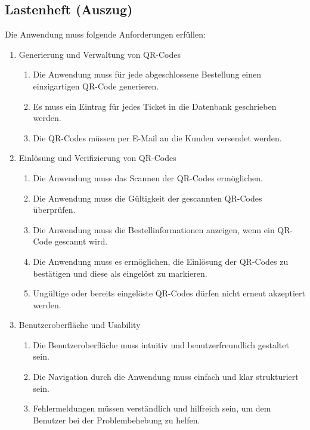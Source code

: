 \subsection{Lastenheft (Auszug)}
\label{app:Lastenheft}

Die Anwendung muss folgende Anforderungen erfüllen:
\begin{enumerate}[itemsep=0em,partopsep=0em,parsep=0em,topsep=0em]
    \item Generierung und Verwaltung von QR-Codes
    \begin{enumerate}
        \item Die Anwendung muss für jede abgeschlossene Bestellung einen einzigartigen QR-Code generieren.
        \item Es muss ein Eintrag für jedes Ticket in die Datenbank geschrieben werden.
        \item Die QR-Codes müssen per E-Mail an die Kunden versendet werden.
    \end{enumerate}

    \item Einlösung und Verifizierung von QR-Codes
    \begin{enumerate}
        \item Die Anwendung muss das Scannen der QR-Codes ermöglichen.
        \item Die Anwendung muss die Gültigkeit der gescannten QR-Codes überprüfen.
        \item Die Anwendung muss die Bestellinformationen anzeigen, wenn ein QR-Code gescannt wird.
        \item Die Anwendung muss es ermöglichen, die Einlösung der QR-Codes zu bestätigen und diese als eingelöst zu markieren.
        \item Ungültige oder bereits eingelöste QR-Codes dürfen nicht erneut akzeptiert werden.
    \end{enumerate}

    \item Benutzeroberfläche und Usability
    \begin{enumerate}
        \item Die Benutzeroberfläche muss intuitiv und benutzerfreundlich gestaltet sein.
        \item Die Navigation durch die Anwendung muss einfach und klar strukturiert sein.
        \item Fehlermeldungen müssen verständlich und hilfreich sein, um dem Benutzer bei der Problembehebung zu helfen.
    \end{enumerate}


\end{enumerate}
